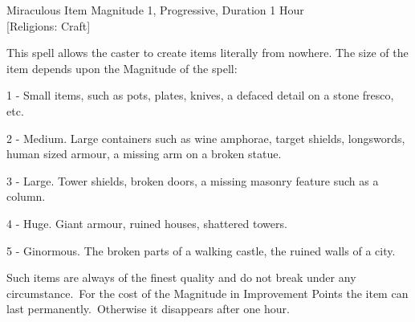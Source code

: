 \begin{rpg-spell}
{Miraculous Item}
{Magnitude 1, Progressive, Duration 1 Hour\\{[Religions: Craft]}}

This spell allows the caster to create items literally from nowhere. The size of the item depends upon the Magnitude of the spell:
\begin{rpg-list}
\item 1 - Small items, such as pots, plates, knives, a defaced detail on a stone fresco, etc.
\item 2 - Medium. Large containers such as wine amphorae, target shields, longswords, human sized armour, a missing arm on a broken statue.
\item 3 - Large. Tower shields, broken doors, a missing masonry feature such as a column.
\item 4 - Huge. Giant armour, ruined houses, shattered towers.
\item 5 - Ginormous. The broken parts of a walking castle, the ruined walls of a city.
\end{rpg-list}
Such items are always of the finest quality and do not break under any circumstance. For the cost of the Magnitude in Improvement Points the item can last permanently. Otherwise it disappears after one hour.
\end{rpg-spell}


